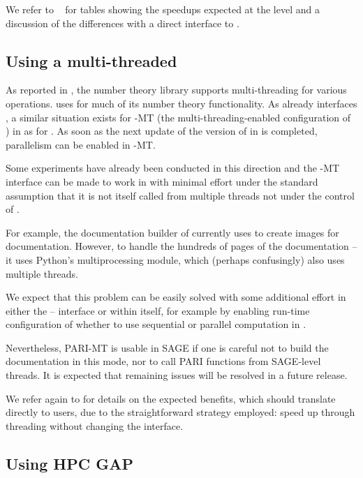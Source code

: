 \documentclass{deliverablereport}
\begin{document}
We refer to ~ for tables showing the speedups expected at the
\Singular level and a discussion of the differences with a direct interface to \FLINT.

\subsection{Using a multi-threaded \Pari}

As reported in , the number theory library \Pari supports
multi-threading for various operations.
\Sage uses \Pari for much of its number theory functionality.
As \Sage already interfaces \Pari, a similar situation exists for \Pari-MT (the multi-threading-enabled
configuration of \Pari) in \SageMath as for \Singular. As soon as the next update of the version of
\Pari in \SageMath is completed, parallelism can be enabled in \Pari-MT.

Some experiments have already been conducted in this direction and the \Pari-MT interface can be
made to work in \SageMath with minimal effort under the standard assumption that it is not itself
called from multiple threads not under the control of \Pari.

For example, the documentation builder of \Sage currently uses \Pari to create images for
documentation. However, to handle the hundreds of pages of the documentation -- it uses Python's
multiprocessing module, which (perhaps confusingly) also uses multiple threads.

We expect that this problem can be easily solved with some additional effort in either the \Sage--\Pari
interface or within \Pari itself, for example by enabling run-time configuration of whether to use
sequential or parallel computation in \Pari.

Nevertheless, PARI-MT is usable in SAGE if one is careful not to build the
documentation in this mode, nor to call PARI functions from SAGE-level
threads. It is expected that remaining issues will be resolved in a future \SageMath
release.

We refer again to  for details on the expected benefits, which should translate
directly to \SageMath users, due to the straightforward strategy employed: speed up \Pari through threading
without changing the interface.

\subsection{Using HPC GAP}
\end{document}
